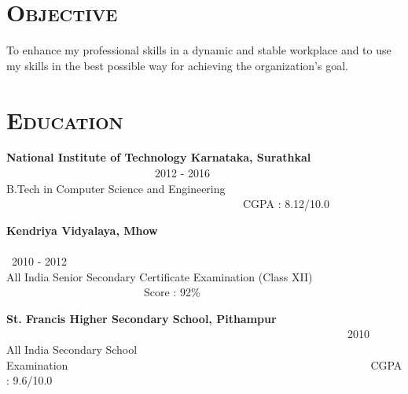\begin{resume}




\section{\textsc{Objective}}

To enhance my professional skills in a dynamic and stable workplace and to use my skills in the best possible way for achieving the organization’s goal.

\iffalse
Seeking a research/project assistantship that would give me a chance to widen my knowledge in my area of interest, apply my skills and build up research profile.
\fi


\section{\textsc{Education}}

\textbf{National Institute of Technology Karnataka, Surathkal} \ \ \ \ \ \ \ \ \ \ \ \ \ \ \ \ \ \ \ \ \ \ \ \ \ \ \ 2012 - 2016 \\
B.Tech in Computer Science and Engineering    \ \ \ \ \ \ \ \ \ \ \ \ \ \ \ \ \ \ \ \ \ \ \ \ \ \ \ \ \ \ \ \ \ \ \ \ \ \ \ \ \ \ \ CGPA : 8.12/10.0

\textbf{Kendriya Vidyalaya, Mhow} \ \ \ \ \ \ \ \ \ \ \ \ \ \ \ \ \ \ \ \ \ \ \ \ \ \ \ \ \ \ \ \ \ \ \ \ \ \ \ \ \ \ \ \ \ \ \ \ \ \ \ \ \ \ \ \ \ \ \ \ \ \ \ \ \ \ \ \ \ \ \ \ \ 2010 - 2012 \\ 
All India Senior Secondary Certificate Examination (Class XII) \ \ \ \ \ \ \ \ \ \ \ \ \ \ \ \ \ \ \ \ \ \ \ \ \ Score : 92\%

\textbf{St. Francis Higher Secondary School, Pithampur
} \ \ \ \ \ \ \ \ \ \ \ \ \ \ \ \ \ \ \ \ \ \ \ \ \ \ \ \ \ \ \ \ \ \ \ \ \ \ \ \ \ \ \ \ \ \ \ \ \ \ \ \ \ \ \ \ \ \ \ \ \ \ 2010 \\ 
All India Secondary School Examination\ \ \ \ \ \ \ \ \ \ \ \ \ \ \ \ \ \ \ \ \ \ \ \ \ \ \ \ \ \ \ \ \ \ \ \ \ \ \ \ \ \ \ \ \ \ \ \ \ \ \ \ \ \  \ CGPA : 9.6/10.0


\end{resume}
